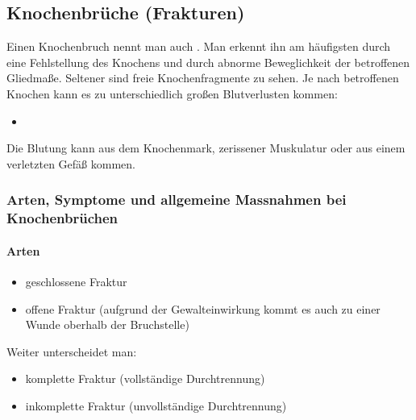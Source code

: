 
\subsection{Knochenbr\"uche (Frakturen)}

Einen Knochenbruch nennt man auch . Man erkennt ihn am häufigsten durch eine Fehlstellung des Knochens und durch abnorme Beweglichkeit der betroffenen Gliedmaße. Seltener sind freie Knochenfragmente zu sehen. Je nach betroffenen Knochen kann es zu unterschiedlich großen Blutverlusten kommen:
\begin{itemize}
	\item {}
\end{itemize}
Die Blutung kann aus dem Knochenmark, zerissener Muskulatur oder aus einem verletzten Gefäß kommen.

\subsubsection{Arten, Symptome und allgemeine Massnahmen bei Knochenbrüchen}

\paragraph{Arten}
\begin{itemize}
    \item geschlossene Fraktur
    \item offene Fraktur (aufgrund der Gewalteinwirkung kommt es auch zu einer Wunde oberhalb der Bruchstelle)
\end{itemize}
Weiter unterscheidet man:
\begin{itemize}
    \item komplette Fraktur (vollständige Durchtrennung)
    \item inkomplette Fraktur (unvollständige Durchtrennung)
\end{itemize}

